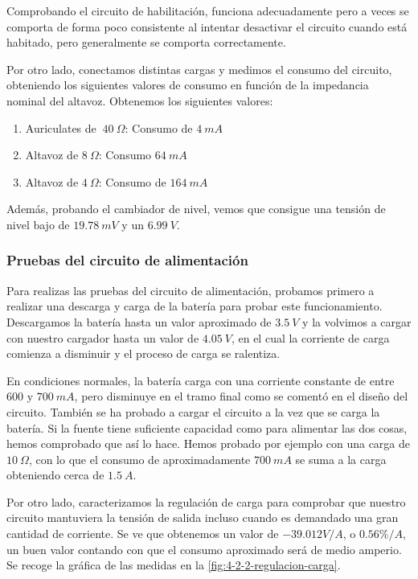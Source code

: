 Comprobando el circuito de habilitación, funciona adecuadamente pero a veces se comporta de forma poco consistente al intentar desactivar el circuito cuando está habitado, pero generalmente se comporta correctamente. 

Por otro lado, conectamos distintas cargas y medimos el consumo del circuito, obteniendo los siguientes valores de consumo en función de la impedancia nominal del altavoz. Obtenemos los siguientes valores:
\begin{enumerate}
    \item Auriculates de $~40\ \Omega$: Consumo de $4\ mA$
    \item Altavoz de $8\ \Omega$: Consumo $64\ mA$
    \item Altavoz de $4\ \Omega$: Consumo de $164\ mA$
\end{enumerate}

Además, probando el cambiador de nivel, vemos que consigue una tensión de nivel bajo de $19.78\ mV$ y un $6.99\ V$.

\subsubsection{Pruebas del circuito de alimentación}

Para realizas las pruebas del circuito de alimentación, probamos primero a realizar una descarga y carga de la batería para probar este funcionamiento. Descargamos la batería hasta un valor aproximado de $3.5\ V$ y la volvimos a cargar con nuestro cargador hasta un valor de $4.05\ V$, en el cual la corriente de carga comienza a disminuir y el proceso de carga se ralentiza.

En condiciones normales, la batería carga con una corriente constante de entre $600$ y $700\ mA$, pero disminuye en el tramo final como se comentó en el diseño del circuito. También se ha probado a cargar el circuito a la vez que se carga la batería. Si la fuente tiene suficiente capacidad como para alimentar las dos cosas, hemos comprobado que así lo hace. Hemos probado por ejemplo con una carga de $10\ \Omega$, con lo que el consumo de aproximadamente $
700\ mA$ se suma a la carga obteniendo cerca de $1.5\ A$.

Por otro lado, caracterizamos la regulación de carga para comprobar que nuestro circuito mantuviera la tensión de salida incluso cuando es demandado una gran cantidad de corriente. Se ve que obtenemos un valor de $-39.012 V/A$, o $0.56\%/A$, un buen valor contando con que el consumo aproximado será de medio amperio. Se recoge la gráfica de las medidas en la \autoref{fig:4-2-2-regulacion-carga}.

